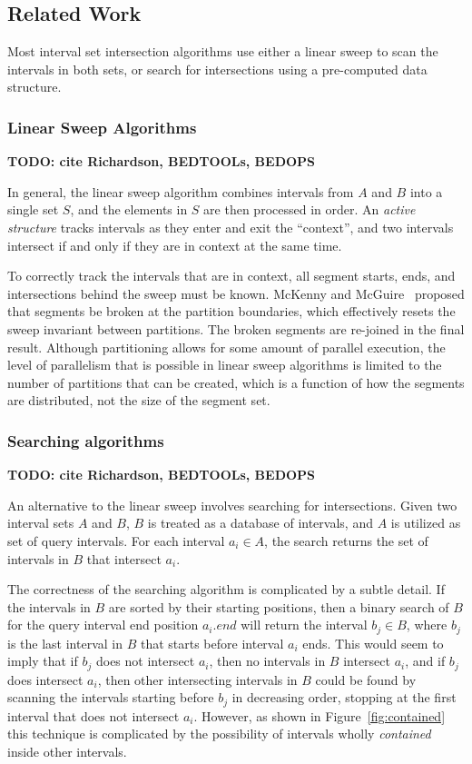 \documentclass{bioinfo}
\begin{document}
	\subsection{Related Work}

	Most interval set intersection algorithms use either a linear sweep to scan the
	intervals in both sets, or search for intersections using a pre-computed data
	structure.

	\subsubsection{Linear Sweep Algorithms}

	\textbf{TODO: cite Richardson, BEDTOOLs, BEDOPS}
	
	In general, the linear sweep algorithm combines intervals from $A$ and $B$ into
	a single set $S$, and the elements in $S$ are then processed in order.  An {\em
	active structure} tracks intervals as they enter and exit the ``context'', and
	two intervals intersect if and only if they are in context at the same time.

	To correctly track the intervals that are in context, all segment starts, ends,
	and intersections behind the sweep must be known.  McKenny and McGuire~\citep{mckenney2009} 
	proposed that segments be broken at the partition boundaries, which effectively 
	resets the sweep invariant between partitions.   The broken segments are re-joined 
	in the final result.  Although partitioning allows for some amount of parallel
	execution, the level of parallelism that is possible in linear sweep algorithms 
	is limited to the number of partitions that can be created, which is a function 
	of how the segments are distributed, not the size of the segment set.

	\subsubsection{Searching algorithms}
	
	\textbf{TODO: cite Richardson, BEDTOOLs, BEDOPS}
	
	An alternative to the linear sweep involves searching for intersections.  Given
	two interval sets $A$ and $B$, $B$ is treated as a database of intervals, and
	$A$ is utilized as set of query intervals.  For each interval $a_i \in A$, the
	search returns the set of intervals in $B$ that intersect $a_i$.

	The correctness of the searching algorithm is complicated by a subtle detail.
	If the intervals in $B$ are sorted by their starting positions, then a binary
	search of $B$ for the query interval end position $a_i.end$ will return the
	interval $b_j \in B$, where $b_j$ is the last interval in $B$ that starts before
	interval $a_i$ ends.  This would seem to imply that if $b_j$ does not intersect
	$a_i$, then no intervals in $B$ intersect $a_i$, and if $b_j$ does intersect
	$a_i$, then other intersecting intervals in $B$ could be found by scanning the
	intervals starting before $b_j$ in decreasing order, stopping at the first
	interval that does not intersect $a_i$.  However, as shown in Figure~\ref{fig:contained} 
	this technique is complicated by the possibility of intervals wholly {\em contained} 
	inside other intervals.
\end{document}
